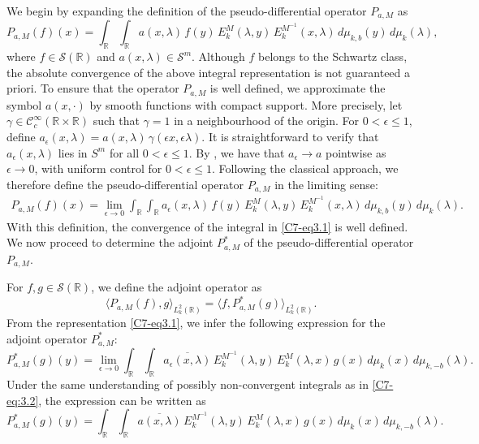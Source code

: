 \documentclass[12pt,a4paper,reqno]{amsproc}
\theoremstyle{definition}
\theoremstyle{remark}
\numberwithin{equation}{section}
\begin{document}
 We begin by expanding the definition of the pseudo-differential operator $P_{a,M}$ as
\begin{equation}\label{C7-eq:3.2}
P_{a,M}(f)(x) = \int_{\mathbb{R}}\int_{\mathbb{R}}a(x,\lambda)\, f(y)\,E_k^M(\lambda,y)\, E_k^{M^{-1}}(x,\lambda)\,d\mu_{k,b}(y)\,d\mu_k(\lambda),
\end{equation}
where $f\in \mathcal{S}(\mathbb{R})$ and $a(x,\lambda) \in \mathcal{S}^m$.
Although $f$ belongs to the Schwartz class, the absolute convergence of the above integral representation is not guaranteed a priori. To ensure that the operator $P_{a,M}$ is well defined, we approximate the symbol $a(x,\cdot)$ by smooth functions with compact support. More precisely, let $\gamma \in \mathcal{C}_c^\infty(\mathbb{R}\times\mathbb{R})$ such that $\gamma=1$ in a neighbourhood of the origin. For $0< \epsilon \le 1$, define  $a_\epsilon(x, \lambda) = a(x,\lambda)\, \gamma(\epsilon x,\epsilon\lambda)$. It is straightforward to verify that $a_\epsilon(x, \lambda)$ lies in $S^m$ for all $0< \epsilon \le 1$. By \cite[Proposition 2.1.10]{Ruzhansky}, we have that $a_\epsilon \to a$ pointwise as $\epsilon\to 0$, with uniform control for $0<\epsilon\le1$. Following the classical approach, we therefore define the pseudo-differential operator $P_{a,M}$ in the limiting sense: 
\begin{eqnarray}
 P_{a,M}(f)(x) = \lim_{\epsilon \to 0}\int_{\mathbb{R}}\int_{\mathbb{R}}a_\epsilon(x,\lambda)\, f(y)\,E_k^M(\lambda,y)\, E_k^{M^{-1}}(x,\lambda)\,d\mu_{k,b}(y)\,d\mu_k(\lambda).
\label{C7-eq3.1}
\end{eqnarray}
With this definition, the convergence of the integral in \eqref{C7-eq3.1} is well defined.
We now proceed to determine the adjoint $P^*_{a,M}$ of the pseudo-differential operator $P_{a,M}$.

 For $f,g \in \mathcal{S}(\mathbb{R})$, we define the adjoint operator as
\begin{equation*}
    \langle P_{a,M}(f),g  \rangle_{L_k^2(\mathbb{R})} = \langle f, P^*_{a,M}(g) \rangle_{L_k^2(\mathbb{R})}.
\end{equation*}
 From the representation \eqref{C7-eq3.1}, we infer the following expression for the adjoint operator $P^*_{a,M}$:
\begin{equation*}
P^*_{a,M}(g)(y)= \lim_{\epsilon \to 0}\int_{\mathbb{R}} \int_{\mathbb{R}} \overline{a_\epsilon(x,\lambda)} \,E_k^{M^{-1}}(\lambda,y)\,E_k^M(\lambda,x)\,g(x)\, d\mu_k(x)\,d\mu_{k,-b}(\lambda).
\end{equation*}
Under the same understanding of possibly non-convergent integrals as in \eqref{C7-eq:3.2}, the expression can be written as
\begin{equation*}
P^*_{a,M}(g)(y)= \int_{\mathbb{R}} \int_{\mathbb{R}} \overline{a(x,\lambda)} \,E_k^{M^{-1}}(\lambda,y)\,E_k^M(\lambda,x)\,g(x)\, d\mu_k(x)\,d\mu_{k,-b}(\lambda).
\end{equation*}
\end{document}
